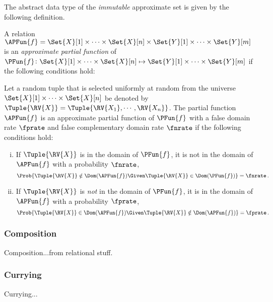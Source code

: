 \documentclass[ ../main.tex]{subfiles}
\begin{document}
The abstract data type of the \emph{immutable} approximate set is given by the following definition.
\begin{definition}
	\label{def:approx_pfun}
	A relation $\APFun{f} = \Set{X}[1] \times \cdots \times \Set{X}[n] \times \Set{Y}[1] \times \cdots \times \Set{Y}[m]$ is an \emph{approximate partial function} of $\PFun{f} \colon \Set{X}[1] \times \cdots \times \Set{X}[n] \mapsto \Set{Y}[1] \times \cdots \times \Set{Y}[m]$ if the following conditions hold:
	
	Let a random tuple that is selected uniformly at random from the universe $\Set{X}[1] \times \cdots \times \Set{X}[n]$ be denoted by $\Tuple{\RV{X}} = \Tuple{\RV{X_1},\cdots,\RV{X_n}}$. The partial function $\APFun{f}$ is an approximate partial function of $\PFun{f}$ with a false domain rate $\fprate$ and false complementary domain rate $\fnrate$ if the following conditions hold:
	\begin{enumerate}[(i)]
		\item If $\Tuple{\RV{X}}$ is in the domain of $\PFun{f}$, it is not in the domain of $\APFun{f}$ with a probability $\fnrate$,
		\begin{equation}
		\Prob{\Tuple{\RV{X}} \notin \Dom(\APFun{f}) \Given \Tuple{\RV{X}} \in \Dom(\PFun{f})} = \fnrate\,.
		\end{equation}    
		\item If $\Tuple{\RV{X}}$ is \emph{not} in the domain of $\PFun{f}$, it is in the domain of $\APFun{f}$ with a probability $\fprate$,
		\begin{equation}
		\Prob{\Tuple{\RV{X}} \in \Dom(\APFun{f}) \Given \Tuple{\RV{X}} \notin \Dom(\APFun{f})} = \fprate\,.
		\end{equation}
	\end{enumerate}
\end{definition}

\subsubsection{Composition}

Composition...from relational stuff.

\subsubsection{Currying}

Currying... 
\end{document}
